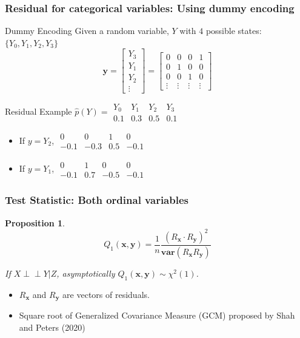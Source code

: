 \documentclass{beamer}
\def\ci{\perp\!\!\!\!\!\perp}
\newtheorem{proposition}{Proposition}
\begin{document}
\begin{frame}
	\frametitle{Residual for categorical variables: Using dummy encoding}
	\begin{block}{Dummy Encoding}
		Given a random variable, $ Y $ with $ 4 $ possible states: $ \{Y_0, Y_1, Y_2, Y_3 \} $
		\begin{equation*}
			\bm{y} = \left[ \begin{array}{c} Y_3 \\ Y_1 \\ Y_2 \\ \vdots \end{array} \right] = \left[ \begin{array}{cccc} 0 & 0 & 0 & 1 \\ 0 & 1 & 0 & 0 \\ 0 & 0 & 1 & 0 \\ \vdots & \vdots & \vdots & \vdots \end{array} \right]
		\end{equation*}
	\end{block}

	\begin{block}{Residual Example}
	$\hat{p}(Y) = \begin{array}{cccc} Y_0 & Y_1 & Y_2 & Y_3 \\ 0.1 & 0.3 & 0.5 & 0.1 \end{array} $
	\begin{itemize}
		\item If $ y = Y_2 $, $ \begin{array}{cccc} 0 & 0 & 1 & 0 \\ -0.1 & -0.3 & 0.5 & -0.1 \end{array} $
		\item If $ y = Y_1 $, $ \begin{array}{cccc} 0 & 1 & 0 & 0 \\ -0.1 & 0.7 & -0.5 & -0.1 \end{array} $
	\end{itemize}
	\end{block}	
\end{frame}

\begin{frame}
	\frametitle{Test Statistic: Both ordinal variables}
	\begin{proposition}
	$$ Q_1(\bm{x}, \bm{y}) = \frac{1}{n} \frac{(R_{\bm{x}} \cdot R_{\bm{y}})^2}{\bm{var}(R_{\bm{x}} R_{\bm{y}})} $$
		\begin{center} If $ X \ci Y | Z $, asymptotically $ Q_1(\bm{x}, \bm{y}) \sim \chi^2(1) $. \end{center}
	\end{proposition}
	\begin{center}
		\begin{itemize}
			\item $ R_{\bm{x}} $ and $ R_{\bm{y}} $ are vectors of residuals.
			\item Square root of Generalized Covariance Measure (GCM) proposed by Shah and Peters (2020)
		\end{itemize}
	\end{center}
\end{frame}
\end{document}
